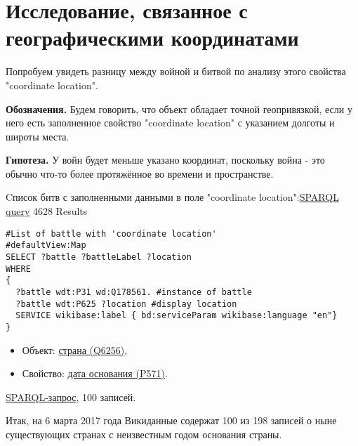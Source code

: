 \section{Исследование, связанное с географическими координатами}


Попробуем увидеть разницу между войной и битвой по анализу этого свойства "coordinate location".

\textbf{Обозначения.} Будем говорить, что объект обладает точной геопривязкой, если у него есть заполненное свойство "coordinate location" с указанием долготы и широты места.

\textbf{Гипотеза.} У войн будет меньше указано координат, поскольку война - это обычно что-то более протяжённое во времени и пространстве.

Cписок битв с заполненными данными в поле "coordinate location":\href{https://query.wikidata.org/#%23List%20of%20battle%20with%20%27coordinate%20location%27%20%0A%23defaultView%3AMap%0ASELECT%20%3Fbattle%20%3FbattleLabel%20%3Flocation%0AWHERE%0A%7B%0A%20%20%3Fbattle%20wdt%3AP31%20wd%3AQ178561.%20%23instance%20of%20battle%0A%20%20%3Fbattle%20wdt%3AP625%20%3Flocation%20%23display%20location%0A%20%20SERVICE%20wikibase%3Alabel%20%7B%20bd%3AserviceParam%20wikibase%3Alanguage%20%22en%22%7D%0A%7D}{SPARQL query} 4628 Results

\begin{lstlisting}[language=SPARQL]
#List of battle with 'coordinate location' 
#defaultView:Map
SELECT ?battle ?battleLabel ?location
WHERE
{
  ?battle wdt:P31 wd:Q178561. #instance of battle
  ?battle wdt:P625 ?location #display location
  SERVICE wikibase:label { bd:serviceParam wikibase:language "en"}
}
\end{lstlisting}

\begin{itemize}
    \item Объект: \href{https://www.wikidata.org/wiki/Q6256}{страна (Q6256)},
    \item Свойство: \href{https://www.wikidata.org/wiki/Property:P571}{дата основания (P571)}.
\end{itemize}



\href{https://query.wikidata.org/#%23List%20of%20%60instances%20of%60%20%22countries%20without%20a%20inception%22%20%0ASELECT%20%3Fcountry%20%3FcountryLabel%20%0AWHERE%0A%7B%0A%20%20%20%20%3Fcountry%20wdt%3AP31%20wd%3AQ6256.%20%23country%0A%20%20%20%20%0A%20%20%20%20MINUS%20%7B%20%3Fcountry%20wdt%3AP571%20%5B%5D%20%7D%20.%20%23inception%20of%20country%0A%20%20%20%20SERVICE%20wikibase%3Alabel%20%7B%20bd%3AserviceParam%20wikibase%3Alanguage%20%22en%22%20%7D%0A%7D%0A%0A}{SPARQL-запрос}, 100 записей.

Итак, на 6 марта 2017 года Викиданные содержат 100 из 198 записей о ныне существующих странах с неизвестным годом основания страны.